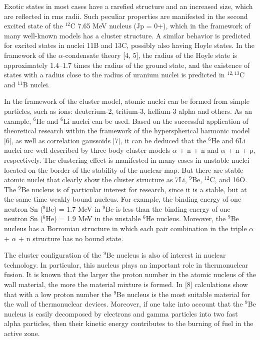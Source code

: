 \documentclass[
12pt, %
oneside, %
english, %
onehalfspacing, %
headsepline, %
]{MastersDoctoralThesis} %
\begin{document}
Exotic states in most cases have a rarefied structure and an increased size, which are reflected in rms radii. Such peculiar properties are manifested in the second excited state of the $^{12}$C 7.65 MeV nucleus (Jp = 0+), which in the framework of many well-known models has a cluster structure. 
A similar behavior is predicted for excited states in nuclei 11B and 13C, possibly also having Hoyle states.
 In the framework of the $\alpha$-condensate theory [4, 5], the radius of the Hoyle state is approximately 1.4–1.7 times the radius of the ground state, and the existence of states with a radius close to the radius of uranium nuclei is predicted in $^{12,13}$C and $^{11}$B nuclei.


In the framework of the cluster model, atomic nuclei can be formed from simple particles, such as ions: deuterium-2, tritium-3, hellium-3 alpha and others.
 As an example, $^{6}$He and $^6$Li nuclei can be used. 
 Based on the successful application of theoretical research within the framework of the hyperspherical harmonic model [6], as well as correlation gaussoids [7], it can be deduced that the $^{6}$He and 6Li nuclei are well described by three-body cluster models $\alpha$ + n + n and $\alpha$ + n + p, respectively.
The clustering effect is manifested in many cases in unstable nuclei located on the border of the stability of the nuclear map.
 But there are stable atomic nuclei that clearly show the cluster structure as 7Li, $^{9}$Be, $^{12}$C, and 16O. 
 The $^{9}$Be nucleus is of particular interest for research, since it is a stable, but at the same time weakly bound nucleus. 
 For example, the binding energy of one neutron Sn ($^{9}$Be) = 1.7 MeV in $^{9}$Be is less than the binding energy of one neutron Sn ($^{6}$He) = 1.9 MeV in the unstable $^{6}$He nucleus. 
 Moreover, the $^{9}$Be nucleus has a Borromian structure in which each pair combination in the triple $\alpha$ + $\alpha$ + n structure has no bound state.


The cluster configuration of the $^{9}$Be nucleus is also of interest in nuclear technology. In particular, this nucleus plays an important role in thermonuclear fusion. It is known that the larger the proton number in the atomic nucleus of the wall material, the more the material mixture is formed. In [8] calculations show that with a low proton number the $^{9}$Be nucleus is the most suitable material for the wall of thermonuclear devices. Moreover, if one take into account that the $^{9}$Be nucleus is easily decomposed by electrons and gamma particles into two fast alpha particles, then their kinetic energy contributes to the burning of fuel in the active zone.
\end{document}
